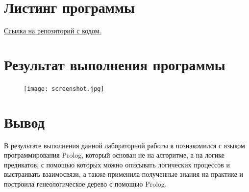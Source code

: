 \documentclass[12pt]{report}
\begin{document}
	\section*{Листинг программы}
	\href{https://github.com/mysticslippers/artificial_intelligence_systems_archive/blob/main/Lab1_ais/code/src.pl}{Ссылка на репозиторий с кодом.}
	
	
	
	\section*{Результат выполнения программы}
	
	\begin{figure}[h]
		\centering
		\texttt{[image: screenshot.jpg]}
	\end{figure}
	
	\section*{Вывод}
	В результате выполнения данной лабораторной работы я познакомился с языком программирования Prolog, который основан не на алгоритме, а на логике предикатов, с помощью которых можно описывать логических процессов и выстраивать взаимосвязи, а также применила полученные знания на практике и построила генеологическое дерево с помощью Prolog.
\end{document}
